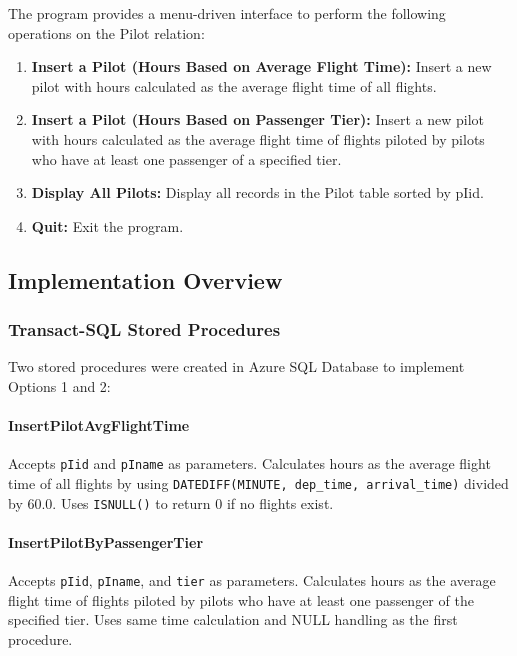 \documentclass[12pt]{article}
\begin{document}
\noindent The program provides a menu-driven interface to perform the following operations on the Pilot relation:

\begin{enumerate}
    \item \textbf{Insert a Pilot (Hours Based on Average Flight Time):} Insert a new pilot with hours calculated as the average flight time of all flights.
    
    \item \textbf{Insert a Pilot (Hours Based on Passenger Tier):} Insert a new pilot with hours calculated as the average flight time of flights piloted by pilots who have at least one passenger of a specified tier.
    
    \item \textbf{Display All Pilots:} Display all records in the Pilot table sorted by pIid.
    
    \item \textbf{Quit:} Exit the program.
\end{enumerate}

\subsection{Implementation Overview}

\subsubsection{Transact-SQL Stored Procedures}

Two stored procedures were created in Azure SQL Database to implement Options 1 and 2:

\paragraph{InsertPilotAvgFlightTime}
Accepts \texttt{pIid} and \texttt{pIname} as parameters. Calculates hours as the average flight time of all flights by using \texttt{DATEDIFF(MINUTE, dep\_time, arrival\_time)} divided by 60.0. Uses \texttt{ISNULL()} to return 0 if no flights exist.

\paragraph{InsertPilotByPassengerTier}
Accepts \texttt{pIid}, \texttt{pIname}, and \texttt{tier} as parameters. Calculates hours as the average flight time of flights piloted by pilots who have at least one passenger of the specified tier. Uses same time calculation and NULL handling as the first procedure.
\end{document}
